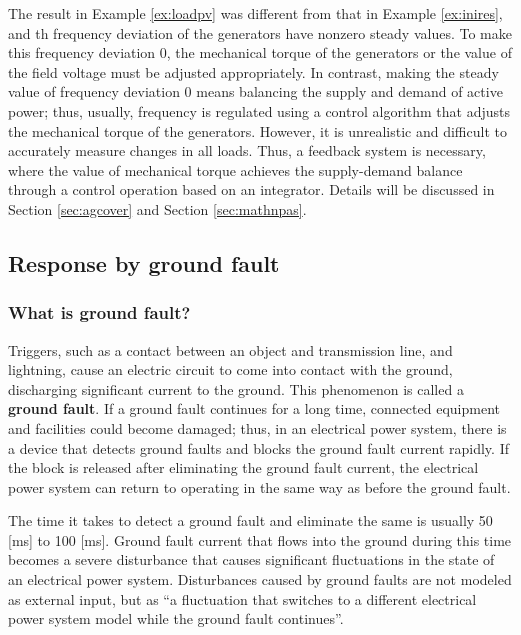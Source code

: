 \documentclass[graybox, envcountchap]{svmult}
\begin{document}
The result in Example \ref{ex:loadpv} was different from that in Example \ref{ex:inires}, and th frequency deviation of the generators have nonzero steady values.
To make this frequency deviation 0, the mechanical torque of the generators or the value of the field voltage must be adjusted appropriately.
In contrast, making the steady value of frequency deviation 0 means balancing the supply and demand of active power; thus, usually, frequency is regulated using a control algorithm that adjusts the mechanical torque of the generators.
However, it is unrealistic and difficult to accurately measure changes in all loads. Thus, a feedback system is necessary, where the value of mechanical torque achieves the supply-demand balance through a control operation based on an integrator.
Details will be discussed in Section \ref{sec:agcover} and Section \ref{sec:mathnpas}.

\subsection{Response by ground fault}\label{sec:fault}

\smallskip
\subsubsection{What is ground fault?}

Triggers, such as a contact between an object and transmission line, and lightning, cause an electric circuit to come into contact with the ground, discharging significant current to the ground.
This phenomenon is called a \textbf{ground fault}. If a ground fault continues for a long time, connected equipment and facilities could become damaged; thus, in an electrical power system, there is a device that detects ground faults and blocks the ground fault current rapidly.
If the block is released after eliminating the ground fault current, the electrical power system can return to operating in the same way as before the ground fault.

The time it takes to detect a ground fault and eliminate the same is usually 50 [ms] to 100 [ms].
Ground fault current that flows into the ground during this time becomes a severe disturbance that causes significant fluctuations in the state of an electrical power system.
Disturbances caused by ground faults are not modeled as external input, but as “a fluctuation that switches to a different electrical power system model while the ground fault continues”.
\end{document}
